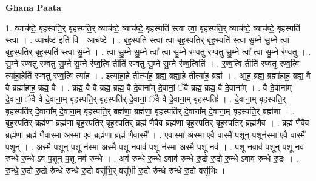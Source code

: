\documentclass[17pt]{extarticle}
\begin{document}
\textbf{Ghana Paata } \newline

1. व्याच॑ष्टे॒ बृह॒स्पति॒र् बृह॒स्पति॒र् व्याच॑ष्टे॒ व्याच॑ष्टे॒ बृह॒स्पति॑ स्त्वा त्वा॒ बृह॒स्पति॒र् व्याच॑ष्टे॒ व्याच॑ष्टे॒ बृह॒स्पति॑ स्त्वा । . व्याच॑ष्ट॒ इति॑ वि - आच॑ष्टे । . बृह॒स्पति॑ स्त्वा त्वा॒ बृह॒स्पति॒र् बृह॒स्पति॑ स्त्वा सु॒म्ने सु॒म्ने त्वा॒ बृह॒स्पति॒र् बृह॒स्पति॑ स्त्वा सु॒म्ने । . त्वा॒ सु॒म्ने सु॒म्ने त्वा᳚ त्वा सु॒म्ने र॑ण्वतु रण्वतु सु॒म्ने त्वा᳚ त्वा सु॒म्ने र॑ण्वतु । . सु॒म्ने र॑ण्वतु रण्वतु सु॒म्ने सु॒म्ने र॑ण्व॒त्वि तीति॑ रण्वतु सु॒म्ने सु॒म्ने र॑ण्व॒त्विति॑ । . र॒ण्व॒त्वि तीति॑ रण्वतु रण्व॒त्वि त्या॑हा॒हेति॑ रण्वतु रण्व॒त्वि त्या॑ह । . इत्या॑हा॒हे तीत्या॑ह॒ ब्रह्म॒ ब्रह्मा॒हे तीत्या॑ह॒ ब्रह्म॑ । . आ॒ह॒ ब्रह्म॒ ब्रह्मा॑हाह॒ ब्रह्म॒ वै वै ब्रह्मा॑हाह॒ ब्रह्म॒ वै । . ब्रह्म॒ वै वै ब्रह्म॒ ब्रह्म॒ वै दे॒वाना᳚म् दे॒वानां॒ ॅवै ब्रह्म॒ ब्रह्म॒ वै दे॒वाना᳚म् । . वै दे॒वाना᳚म् दे॒वानां॒ ॅवै वै दे॒वाना॒म् बृह॒स्पति॒र् बृह॒स्पति॑र् दे॒वानां॒ ॅवै वै दे॒वाना॒म् बृह॒स्पतिः॑ । . दे॒वाना॒म् बृह॒स्पति॒र् बृह॒स्पति॑र् दे॒वाना᳚म् दे॒वाना॒म् बृह॒स्पति॒र् ब्रह्म॑णा॒ ब्रह्म॑णा॒ बृह॒स्पति॑र् दे॒वाना᳚म् दे॒वाना॒म् बृह॒स्पति॒र् ब्रह्म॑णा । . बृह॒स्पति॒र् ब्रह्म॑णा॒ ब्रह्म॑णा॒ बृह॒स्पति॒र् बृह॒स्पति॒र् ब्रह्म॑ णै॒वैव ब्रह्म॑णा॒ बृह॒स्पति॒र् बृह॒स्पति॒र् ब्रह्म॑णै॒व । . ब्रह्म॑ णै॒वैव ब्रह्म॑णा॒ ब्रह्म॑ णै॒वास्मा॑ अस्मा ए॒व ब्रह्म॑णा॒ ब्रह्म॑ णै॒वास्मै᳚ । . ए॒वास्मा॑ अस्मा ए॒वै वास्मै॑ प॒शून् प॒शून॑स्मा ए॒वै वास्मै॑ प॒शून् । . अ॒स्मै॒ प॒शून् प॒शू न॑स्मा अस्मै प॒शू नवाव॑ प॒शू न॑स्मा अस्मै प॒शू नव॑ । . प॒शू नवाव॑ प॒शून् प॒शू नव॑ रुन्धे रु॒न्धे ऽव॑ प॒शून् प॒शू नव॑ रुन्धे । . अव॑ रुन्धे रु॒न्धे ऽवाव॑ रुन्धे रु॒द्रो रु॒द्रो रु॒न्धे ऽवाव॑ रुन्धे रु॒द्रः । . रु॒न्धे॒ रु॒द्रो रु॒द्रो रु॑न्धे रुन्धे रु॒द्रो वसु॑भि॒र् वसु॑भी रु॒द्रो रु॑न्धे रुन्धे रु॒द्रो वसु॑भिः । \newline
\end{document}

